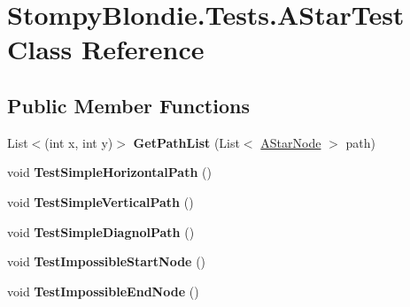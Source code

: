 \hypertarget{class_stompy_blondie_1_1_tests_1_1_a_star_test}{}\section{Stompy\+Blondie.\+Tests.\+A\+Star\+Test Class Reference}
\label{class_stompy_blondie_1_1_tests_1_1_a_star_test}
\subsection*{Public Member Functions}
\begin{DoxyCompactItemize}
\item 
\mbox{\label{class_stompy_blondie_1_1_tests_1_1_a_star_test_af16e343de26cbff5d0bb64652453013a}} 
List$<$(int x, int y)$>$ {\bfseries Get\+Path\+List} (List$<$ \mbox{\hyperlink{class_stompy_blondie_1_1_math_1_1_a_star_node}{A\+Star\+Node}} $>$ path)
\item 
\mbox{\label{class_stompy_blondie_1_1_tests_1_1_a_star_test_a6526af08de251c303a5c30d852dbd8c3}} 
void {\bfseries Test\+Simple\+Horizontal\+Path} ()
\item 
\mbox{\label{class_stompy_blondie_1_1_tests_1_1_a_star_test_a8e5d78221da8a798dfd5819800236061}} 
void {\bfseries Test\+Simple\+Vertical\+Path} ()
\item 
\mbox{\label{class_stompy_blondie_1_1_tests_1_1_a_star_test_aad68c04cdb056e578035c9dfa37fdab7}} 
void {\bfseries Test\+Simple\+Diagnol\+Path} ()
\item 
\mbox{\label{class_stompy_blondie_1_1_tests_1_1_a_star_test_af506a164445d7e49964673ed3b5039de}} 
void {\bfseries Test\+Impossible\+Start\+Node} ()
\item 
\mbox{\label{class_stompy_blondie_1_1_tests_1_1_a_star_test_ae054b5ca2f4e9434918ece6887abb1c4}} 
void {\bfseries Test\+Impossible\+End\+Node} ()
\item 
\mbox{\label{class_stompy_blondie_1_1_tests_1_1_a_star_test_a7769798931b8c2da20793c9c65cf9f8a}} 

\end{DoxyCompactItemize}
